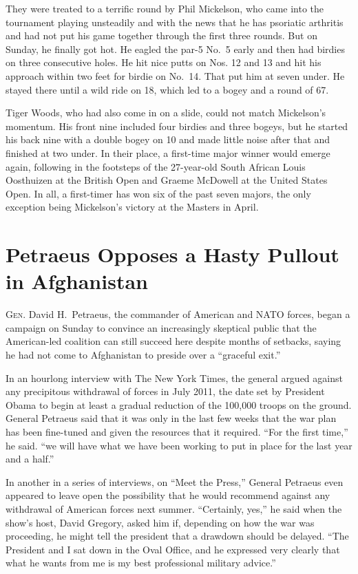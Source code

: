 ﻿\documentclass[12pt]{article}
\begin{document}
They were treated to a terrific round by Phil Mickelson, who came into the tournament playing
unsteadily and with the news that he has psoriatic arthritis and had not put his game together
through the first three rounds. But on Sunday, he finally got hot. He eagled the par-5 No.~5 early
and then had birdies on three consecutive holes. He hit nice putts on Nos. 12 and 13 and hit his
approach within two feet for birdie on No.~14. That put him at seven under. He stayed there until a
wild ride on 18, which led to a bogey and a round of 67.

Tiger Woods, who had also come in on a slide, could not match Mickelson's momentum. His front nine
included four birdies and three bogeys, but he started his back nine with a double bogey on 10 and
made little noise after that and finished at two under. In their place, a first-time major winner
would emerge again, following in the footsteps of the 27-year-old South African Louis Oosthuizen at
the British Open and Graeme McDowell at the United States Open. In all, a first-timer has won six of
the past seven majors, the only exception being Mickelson's victory at the Masters in April.

\section{Petraeus Opposes a Hasty Pullout in Afghanistan}

\lettrine{G}{en}. David H.~Petraeus, the commander of American and NATO
forces, began a campaign on Sunday to convince an increasingly skeptical public that the
American-led coalition can still succeed here despite months of setbacks, saying he had not come to
Afghanistan to preside over a ``graceful exit.''

In an hourlong interview with The New York Times, the general argued against any precipitous
withdrawal of forces in July 2011, the date set by President Obama to begin at least a gradual
reduction of the 100,000 troops on the ground. General Petraeus said that it was only in the last
few weeks that the war plan has been fine-tuned and given the resources that it required. ``For the
first time,'' he said. ``we will have what we have been working to put in place for the last year
and a half.''

In another in a series of interviews, on ``Meet the Press,'' General Petraeus even appeared to leave
open the possibility that he would recommend against any withdrawal of American forces next summer.
``Certainly, yes,'' he said when the show's host, David Gregory, asked him if, depending on how the
war was proceeding, he might tell the president that a drawdown should be delayed. ``The President
and I sat down in the Oval Office, and he expressed very clearly that what he wants from me is my
best professional military advice.''
\end{document}
